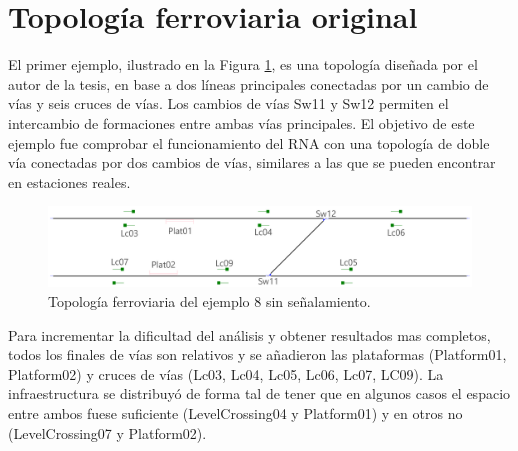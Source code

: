 \section{Topología ferroviaria original}

	El primer ejemplo, ilustrado en la Figura \ref{fig:EJ8_1}, es una topología diseñada por el autor de la tesis, en base a dos líneas principales conectadas por un cambio de vías y seis cruces de vías. Los cambios de vías Sw11 y Sw12 permiten el intercambio de formaciones entre ambas vías principales. El objetivo de este ejemplo fue comprobar el funcionamiento del RNA con una topología de doble vía conectadas por dos cambios de vías, similares a las que se pueden encontrar en estaciones reales.
	
	\begin{figure}[h]
		\centering
		\includegraphics[width=1\textwidth]{resultados-obtenidos/ejemplo8/images/8_empty.png}
		\centering\caption{Topología ferroviaria del ejemplo 8 sin señalamiento.}
		\label{fig:EJ8_1}
	\end{figure}
	
	Para incrementar la dificultad del análisis y obtener resultados mas completos, todos los finales de vías son relativos y se añadieron las plataformas (Platform01, Platform02) y cruces de vías (Lc03, Lc04, Lc05, Lc06, Lc07, LC09). La infraestructura se distribuyó de forma tal de tener que en algunos casos el espacio entre ambos fuese suficiente (LevelCrossing04 y Platform01) y en otros no (LevelCrossing07 y Platform02).
